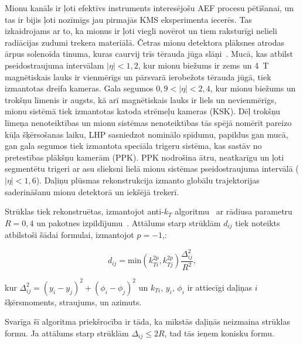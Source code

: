 Mionu kanāls ir ļoti efektīvs instruments interesējošu \gls{AEF} procesu pētīšanai, un tas ir bijis ļoti nozīmīgs jau pirmajās KMS eksperimenta iecerēs. Tas izkaidrojams ar to, ka mionus ir ļoti viegli novērot un tiem raksturīgi nelieli radiācijas zudumi trekera materiālā. Četras mionu detektora plāksnes atrodas ārpus solenoīda tinuma, kuras caurvij trīs tērauda jūga slāņi~\cite{muon_tech_rep}. Mucā, kas atbilst pseidostraujuma intervālam $\left|\eta\right|<1,2$, kur mionu biežums ir zems un 4~T magnētiskais lauks ir vienmērīgs un pārsvarā ierobežots tērauda jūgā, tiek izmantotas dreifa kameras. Gala segumos $0,9<\left|\eta\right|<2,4$, kur mionu biežums un trokšņu līmenis ir augsts, kā arī magnētiskais lauks ir liels un nevienmērīgs, mionu sistēmā tiek izmantotas katoda strēmeļu kameras (KSK). Dēļ trokšņu līmeņa nenoteiktības un mionu sistēmas nenoteiktības tās spējā nomērīt pareizo kūļa šķērsošanas laiku, LHP sasniedzot nominālo spīdumu, papildus gan mucā, gan gala segumos tiek izmantota speciāla trigeru sistēma, kas sastāv no pretestības plākšņu kamerām (PPK). PPK nodrošina ātru, neatkarīgu un ļoti segmentētu trigeri ar asu \pt slieksni lielā mionu sistēmas pseidostraujuma intervālā ($\left|\eta\right|<1,6$). Daļiņu plūsmas rekonstrukcija izmanto globālu trajektorijas saderināšanu mionu detektorā un iekšējā trekerī. 

Strūklas tiek rekonstruētas, izmantojot anti-$k_{T}$ algoritmu~\cite{Cacciari:2008gp} ar rādiusa parametru $R=0,4$ un \FASTJET pakotnes izpildījumu~\cite{Cacciari:2011ma}. Attālums starp strūklām $d_{ij}$ tiek noteikts atbilstoši šādai formulai, izmantojot $p=-1$,:

\begin{equation}
d_{ij}=\text{min}(k_{Ti}^{2p}, k_{Tj}^{2p})\frac{\Delta_{ij}^{2}}{R^{2}},
\end{equation}

kur $\Delta_{ij}^{2}=(y_{i}-y_{j})^{2}+(\phi_{i}-\phi_{j})^{2}$ un $k_{Ti}$, $y_{i}$, $\phi_{i}$ ir attiecīgi daļiņas $i$ šķērsmoments, straujums, un azimuts. 

Svarīga šī algoritma priekšrocība ir tāda, ka \gls{mīkstās} daļiņās neizmaina strūklas formu. Ja attālums starp strūklām $\Delta_{ij}\leq2R$, tad tās ieņem konisku formu. 
